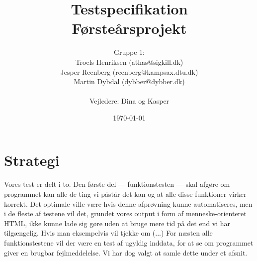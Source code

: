 \documentclass[a4paper,oneside,article, titlepage]{memoir}
\title{Testspecifikation  \\ \small{Førsteårsprojekt}}
\author
{
  Gruppe 1:\\
  Troels Henriksen (athas@sigkill.dk)\\
  Jesper Reenberg (reenberg@kampsax.dtu.dk)\\
  Martin Dybdal (dybber@dybber.dk)\\ \\
  Vejledere: Dina og Kasper
}
\date{\today}
\begin{document}
\maketitle
\tableofcontents*
\newpage









 

\chapter{Strategi}
Vores test er delt i to. Den første del --- funktionstesten --- skal
afgøre om programmet kan alle de ting vi påstår det kan og at alle
disse funktioner virker korrekt. Det optimale ville være hvis denne
afprøvning kunne automatiseres, men i de fleste af testene vil det,
grundet vores output i form af menneske-orienteret HTML, ikke kunne
lade sig gøre uden at bruge mere tid på det end vi har
tilgængelig. Hvis man eksempelvis vil tjekke om (...)  For næsten alle
funktionstestene vil der være en test af ugyldig inddata, for at se om
programmet giver en brugbar fejlmeddelelse. Vi har dog valgt at samle
dette under et afsnit.
\end{document}
